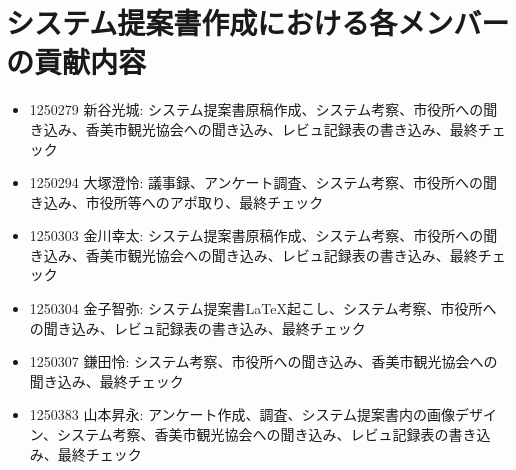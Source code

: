 \documentclass[a4paper,dvipdfmx]{jarticle}
\begin{document}
\section*{システム提案書作成における各メンバーの貢献内容}

\begin{itemize}
    \item 1250279 新谷光城: システム提案書原稿作成、システム考察、市役所への聞き込み、香美市観光協会への聞き込み、レビュ記録表の書き込み、最終チェック
    \item 1250294 大塚澄怜: 議事録、アンケート調査、システム考察、市役所への聞き込み、市役所等へのアポ取り、最終チェック
    \item 1250303 金川幸太: システム提案書原稿作成、システム考察、市役所への聞き込み、香美市観光協会への聞き込み、レビュ記録表の書き込み、最終チェック
    \item 1250304 金子智弥: システム提案書\LaTeX 起こし、システム考察、市役所への聞き込み、レビュ記録表の書き込み、最終チェック
    \item 1250307 鎌田怜: システム考察、市役所への聞き込み、香美市観光協会への聞き込み、最終チェック
    \item 1250383 山本昇永: アンケート作成、調査、システム提案書内の画像デザイン、システム考察、香美市観光協会への聞き込み、レビュ記録表の書き込み、最終チェック
\end{itemize}
\end{document}
